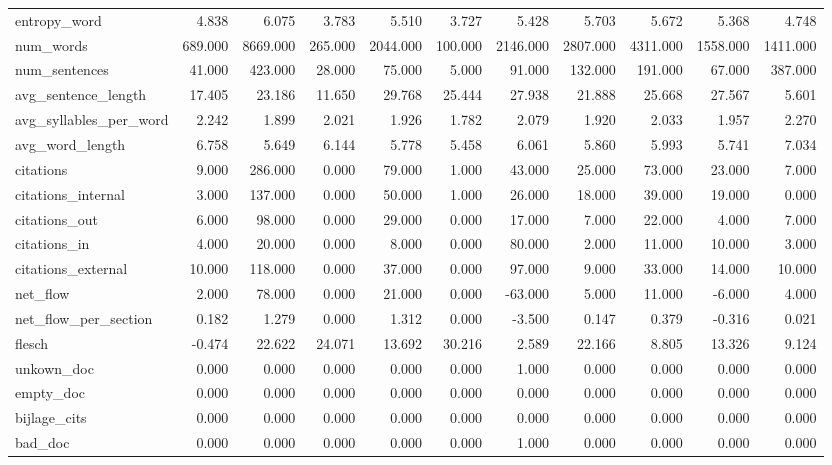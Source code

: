 \begin{tabular}{lrrrrrrrrrr}
\cline{1-11}
entropy\_word & 4.838 & 6.075 & 3.783 & 5.510 & 3.727 & 5.428 & 5.703 & 5.672 & 5.368 & 4.748 \\
\cline{1-11}
num\_words & 689.000 & 8669.000 & 265.000 & 2044.000 & 100.000 & 2146.000 & 2807.000 & 4311.000 & 1558.000 & 1411.000 \\
\cline{1-11}
num\_sentences & 41.000 & 423.000 & 28.000 & 75.000 & 5.000 & 91.000 & 132.000 & 191.000 & 67.000 & 387.000 \\
\cline{1-11}
avg\_sentence\_length & 17.405 & 23.186 & 11.650 & 29.768 & 25.444 & 27.938 & 21.888 & 25.668 & 27.567 & 5.601 \\
\cline{1-11}
avg\_syllables\_per\_word & 2.242 & 1.899 & 2.021 & 1.926 & 1.782 & 2.079 & 1.920 & 2.033 & 1.957 & 2.270 \\
\cline{1-11}
avg\_word\_length & 6.758 & 5.649 & 6.144 & 5.778 & 5.458 & 6.061 & 5.860 & 5.993 & 5.741 & 7.034 \\
\cline{1-11}
citations & 9.000 & 286.000 & 0.000 & 79.000 & 1.000 & 43.000 & 25.000 & 73.000 & 23.000 & 7.000 \\
\cline{1-11}
citations\_internal & 3.000 & 137.000 & 0.000 & 50.000 & 1.000 & 26.000 & 18.000 & 39.000 & 19.000 & 0.000 \\
\cline{1-11}
citations\_out & 6.000 & 98.000 & 0.000 & 29.000 & 0.000 & 17.000 & 7.000 & 22.000 & 4.000 & 7.000 \\
\cline{1-11}
citations\_in & 4.000 & 20.000 & 0.000 & 8.000 & 0.000 & 80.000 & 2.000 & 11.000 & 10.000 & 3.000 \\
\cline{1-11}
citations\_external & 10.000 & 118.000 & 0.000 & 37.000 & 0.000 & 97.000 & 9.000 & 33.000 & 14.000 & 10.000 \\
\cline{1-11}
net\_flow & 2.000 & 78.000 & 0.000 & 21.000 & 0.000 & -63.000 & 5.000 & 11.000 & -6.000 & 4.000 \\
\cline{1-11}
net\_flow\_per\_section & 0.182 & 1.279 & 0.000 & 1.312 & 0.000 & -3.500 & 0.147 & 0.379 & -0.316 & 0.021 \\
\cline{1-11}
flesch & -0.474 & 22.622 & 24.071 & 13.692 & 30.216 & 2.589 & 22.166 & 8.805 & 13.326 & 9.124 \\
\cline{1-11}
unkown\_doc & 0.000 & 0.000 & 0.000 & 0.000 & 0.000 & 1.000 & 0.000 & 0.000 & 0.000 & 0.000 \\
\cline{1-11}
empty\_doc & 0.000 & 0.000 & 0.000 & 0.000 & 0.000 & 0.000 & 0.000 & 0.000 & 0.000 & 0.000 \\
\cline{1-11}
bijlage\_cits & 0.000 & 0.000 & 0.000 & 0.000 & 0.000 & 0.000 & 0.000 & 0.000 & 0.000 & 0.000 \\
\cline{1-11}
bad\_doc & 0.000 & 0.000 & 0.000 & 0.000 & 0.000 & 1.000 & 0.000 & 0.000 & 0.000 & 0.000 \\
\cline{1-11}
\bottomrule
\end{tabular}
